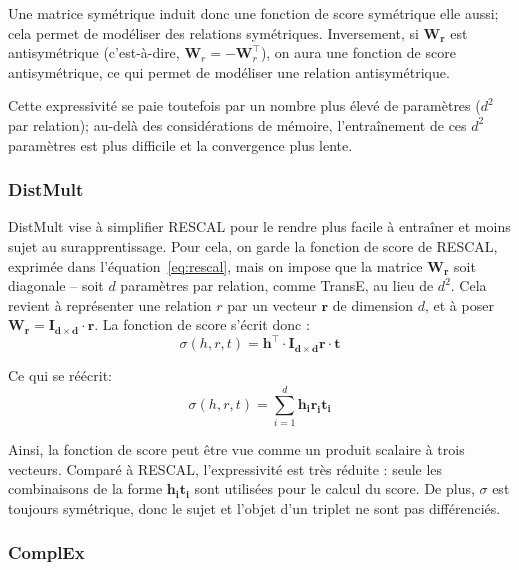 Une matrice symétrique induit donc une fonction de score symétrique elle aussi; cela permet de modéliser des relations symétriques. Inversement, si $\mathbf{W_r}$ est antisymétrique (c'est-à-dire, $\mathbf{W}_r = -\mathbf{W}_r^\top$), on aura une fonction de score antisymétrique, ce qui permet de modéliser une relation antisymétrique.

Cette expressivité se paie toutefois par un nombre plus élevé de paramètres ($d^2$ par relation); au-delà des considérations de mémoire, l'entraînement de ces $d^2$ paramètres est plus difficile et la convergence plus lente.

\subsubsection{DistMult}

DistMult \cite{distmult} vise à simplifier RESCAL pour le rendre plus facile à entraîner et moins sujet au surapprentissage. Pour cela, on garde la fonction de score de RESCAL, exprimée dans l'équation~\ref{eq:rescal}, mais on impose que la matrice $\mathbf{W_r}$ soit diagonale – soit $d$ paramètres par relation, comme TransE, au lieu de $d^2$. Cela revient à représenter une relation $r$ par un vecteur $\mathbf{r}$ de dimension $d$, et à poser $\mathbf{W_r = I_{d\times d} \cdot r}$. La fonction de score s'écrit donc :
\begin{equation}
    \label{eq:distmult}
    \sigma(h, r, t) = \mathbf{h^\top \cdot I_{d\times d}r \cdot t}
\end{equation}

Ce qui se réécrit:
\begin{equation}
    \sigma(h, r, t) = \sum_{i=1}^{d} \mathbf{h_i r_i t_i}
\end{equation}

Ainsi, la fonction de score peut être vue comme un produit scalaire à trois vecteurs. Comparé à RESCAL, l'expressivité est très réduite : seule les combinaisons de la forme $\mathbf{h_i t_i}$ sont utilisées pour le calcul du score. De plus, $\sigma$ est toujours symétrique, donc le sujet et l'objet d'un triplet ne sont pas différenciés.

\subsubsection{ComplEx}
\label{subsec:complex}

